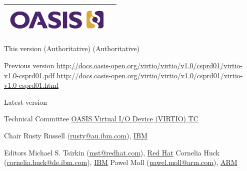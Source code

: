 \begin{titlepage}
\thispagestyle{fancy}

\begin{tabular*}{\textwidth}{@{\extracolsep{\fill}}lr}
	\includegraphics[height=0.55in]{images/oasis.png}\\
	\hline
\end{tabular*}

\oasistitle{\virtioversion}
\oasisstagelabel{\virtiodraftstagename\virtiodraftstageextratitle}
\vspace{0.05in}
\oasisstagelabel{\virtioworkingdraftdate}


\begin{oasistitlesection}{This version}
\virtiourltex{ }(Authoritative)\newline
\virtiourlpdf{ }(Authoritative)\newline
\virtiourlhtml
\end{oasistitlesection}

\begin{oasistitlesection}{Previous version}
\url{http://docs.oasis-open.org/virtio/virtio/v1.0/csprd01/virtio-v1.0-csprd01.pdf}\newline
\url{http://docs.oasis-open.org/virtio/virtio/v1.0/csprd01/virtio-v1.0-csprd01.html}
\end{oasistitlesection}

\begin{oasistitlesection}{Latest version}
\virtiourllatestpdf\newline
\virtiourllatesthtml
\end{oasistitlesection}

\begin{oasistitlesection}{Technical Committee}
\href{https://www.oasis-open.org/committees/virtio/}{OASIS Virtual I/O Device (VIRTIO) TC}
\end{oasistitlesection}

\begin{oasistitlesection}{Chair}
Rusty Russell (\href{mailto:rusty@au.ibm.com}{rusty@au.ibm.com}), \href{http://www.ibm.com/}{IBM}\newline
\end{oasistitlesection}

\begin{oasistitlesection}{Editors}
Michael S. Tsirkin (\href{mailto:mst@redhat.com}{mst@redhat.com}), \href{http://www.redhat.com/}{Red Hat}\newline
Cornelia Huck (\href{mailto:cornelia.huck@de.ibm.com}{cornelia.huck@de.ibm.com}), \href{http://www.ibm.com/}{IBM}\newline
Pawel Moll (\href{mailto:pawel.moll@arm.com}{pawel.moll@arm.com}), \href{https://arm.com/}{ARM}
\end{oasistitlesection}



\end{titlepage}
